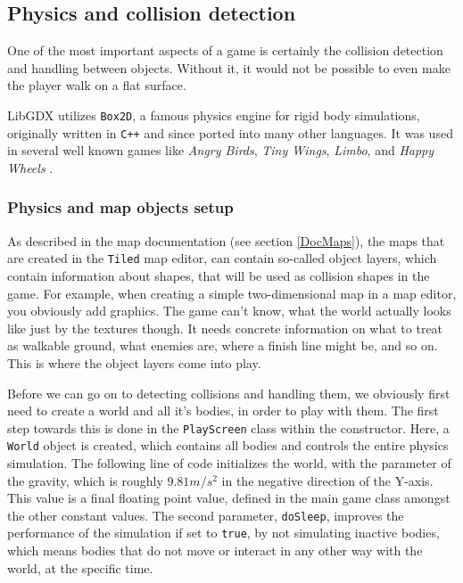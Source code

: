 \documentclass[12p]{article}
\begin{document}
\subsection{Physics and collision detection} \label{DocCollisions}

One of the most important aspects of a game is certainly the collision detection and handling between objects. Without it, it would not be possible to even make the player walk on a flat surface.

LibGDX utilizes \texttt{Box2D}, a famous physics engine for rigid body simulations, originally written in \texttt{C++} and since ported into many other languages. It was used in several well known games like \emph{Angry Birds}, \emph{Tiny Wings}, \emph{Limbo}, and \emph{Happy Wheels} \cite{box2DGithub}\cite{box2DWikipedia}.

\subsubsection{Physics and map objects setup} \label{DocPhysicsAndBodySetup}

As described in the map documentation (see section \ref{DocMaps}), the maps that are created in the \texttt{Tiled} map editor, can contain so-called object layers, which contain information about shapes, that will be used as collision shapes in the game. For example, when creating a simple two-dimensional map in a map editor, you obviously add graphics. The game can't know, what the world actually looks like just by the textures though. It needs concrete information on what to treat as walkable ground, what enemies are, where a finish line might be, and so on. This is where the object layers come into play.

Before we can go on to detecting collisions and handling them, we obviously first need to create a world and all it's bodies, in order to play with them. The first step towards this is done in the \texttt{PlayScreen} class within the constructor. Here, a \texttt{World} object is created, which contains all bodies and controls the entire physics simulation. The following line of code initializes the world, with the parameter of the gravity, which is roughly $9.81m/s^2$ in the negative direction of the Y-axis. This value is a final floating point value, defined in the main game class amongst the other constant values. The second parameter, \texttt{doSleep}, improves the performance of the simulation if set to \texttt{true}, by not simulating inactive bodies, which means bodies that do not move or interact in any other way with the world, at the specific time.
\end{document}
